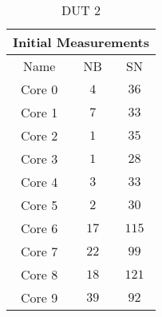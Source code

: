 \begin{table}[H]
    \centering
    \begin{tabular}{|| c | c | c ||}
    \hline
    \multicolumn{3}{||c||}{Initial Measurements} \\ [0.5ex] \hline\hline
    Name & NB & SN \\\hline
    Core 0 & $4$ & $36$ \\
    Core 1 & $7$ & $33$ \\
    Core 2 & $1$ & $35$ \\
    Core 3 & $1$ & $28$ \\
    Core 4 & $3$ & $33$ \\
    Core 5 & $2$ & $30$ \\
    Core 6 & $17$ & $115$ \\
    Core 7 & $22$ & $99$ \\
    Core 8 & $18$ & $121$ \\
    Core 9 & $39$ & $92$ \\\hline
    \end{tabular}
    \caption{DUT 2}
    \label{tab:initial-measurements-exp-3-dut-2}
\end{table}